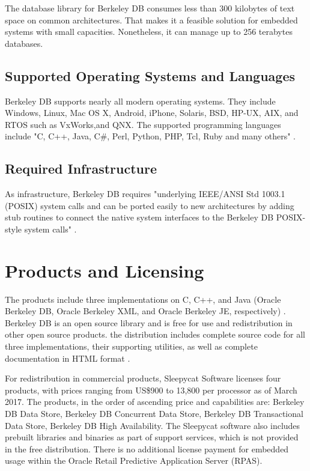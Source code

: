 \documentclass[9pt,twocolumn,twoside]{../../styles/osajnl}
\begin{document}
The database library for Berkeley DB consumes less than 300 kilobytes of text space on common 
architectures. That makes it a feasible solution for embedded systems with small capacities.
Nonetheless, it can manage up to 256 terabytes databases. 

\subsection{Supported Operating Systems and Languages}

Berkeley DB supports nearly all modern operating systems. They include Windows, Linux, Mac OS X,
Android, iPhone, Solaris, BSD, HP-UX, AIX, and RTOS such as VxWorks,and QNX.
\newline
The supported programming languages include "C, C++, Java, C\#, Perl, Python, PHP, Tcl, Ruby and 
many others" \cite{bdb-datasheet}.

\subsection{Required Infrastructure}
As infrastructure, Berkeley DB requires "underlying IEEE/ANSI Std 1003.1 (POSIX) system calls and 
can be ported easily to new architectures by adding stub routines to connect the native system 
interfaces to the Berkeley DB POSIX-style system calls" \cite{stanford-web}.

\section{Products and Licensing}

The products include three implementations on C, C++, and Java (Oracle Berkeley DB, Oracle Berkeley 
XML, and Oracle Berkeley JE, respectively) \cite{oracle-products}.
\newline
Berkeley DB is an open source library and is free for use and redistribution in other open source products. 
the distribution includes complete source code for all three implementations, their supporting utilities, 
as well as complete documentation in HTML format \cite{stanford-web}.

For redistribution in commercial products, Sleepycat Software licenses four products, with prices 
ranging from US\$900 to 13,800 per processor \cite{oracle-price} as of March 2017. The products, 
in the order of ascending price and capabilities are: Berkeley DB Data Store, Berkeley DB Concurrent Data Store,
Berkeley DB Transactional Data Store, Berkeley DB High Availability.
The Sleepycat software also includes prebuilt libraries and binaries as part of support services, which is not provided in the free distribution.
There is no additional license payment for embedded usage within the Oracle Retail Predictive Application Server (RPAS).
\end{document}
